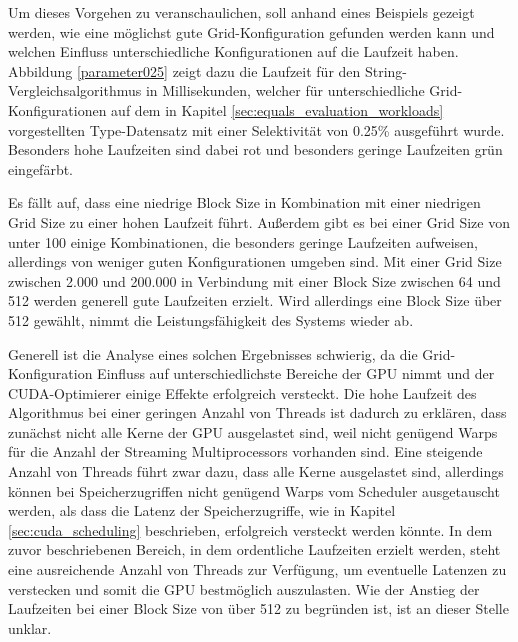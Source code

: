 Um dieses Vorgehen zu veranschaulichen, soll anhand eines Beispiels gezeigt werden, wie eine möglichst gute Grid-Konfiguration gefunden werden kann und welchen Einfluss unterschiedliche Konfigurationen auf die Laufzeit haben.
Abbildung \ref{parameter025} zeigt dazu die Laufzeit für den String-Vergleichsalgorithmus in Millisekunden, welcher für unterschiedliche Grid-Konfigurationen auf dem in Kapitel \ref{sec:equals_evaluation_workloads} vorgestellten Type-Datensatz mit einer Selektivität von 0.25\% ausgeführt wurde.
Besonders hohe Laufzeiten sind dabei rot und besonders geringe Laufzeiten grün eingefärbt.

Es fällt auf, dass eine niedrige Block Size in Kombination mit einer niedrigen Grid Size zu einer hohen Laufzeit führt.
Außerdem gibt es bei einer Grid Size von unter 100 einige Kombinationen, die besonders geringe Laufzeiten aufweisen, allerdings von weniger guten Konfigurationen umgeben sind.
Mit einer Grid Size zwischen 2.000 und 200.000 in Verbindung mit einer Block Size zwischen 64 und 512 werden generell gute Laufzeiten erzielt.
Wird allerdings eine Block Size über 512 gewählt, nimmt die Leistungsfähigkeit des Systems wieder ab.

Generell ist die Analyse eines solchen Ergebnisses schwierig, da die Grid-Konfiguration Einfluss auf unterschiedlichste Bereiche der GPU nimmt und der CUDA-Optimierer einige Effekte erfolgreich versteckt.
Die hohe Laufzeit des Algorithmus bei einer geringen Anzahl von Threads ist dadurch zu erklären, dass zunächst nicht alle Kerne der GPU ausgelastet sind, weil nicht genügend Warps für die Anzahl der Streaming Multiprocessors vorhanden sind.
Eine steigende Anzahl von Threads führt zwar dazu, dass alle Kerne ausgelastet sind, allerdings können bei Speicherzugriffen nicht genügend Warps vom Scheduler ausgetauscht werden, als dass die Latenz der Speicherzugriffe, wie in Kapitel \ref{sec:cuda_scheduling} beschrieben, erfolgreich versteckt werden könnte.
In dem zuvor beschriebenen Bereich, in dem ordentliche Laufzeiten erzielt werden, steht eine ausreichende Anzahl von Threads zur Verfügung, um eventuelle Latenzen zu verstecken und somit die GPU bestmöglich auszulasten.
Wie der Anstieg der Laufzeiten bei einer Block Size von über 512 zu begründen ist, ist an dieser Stelle unklar.

